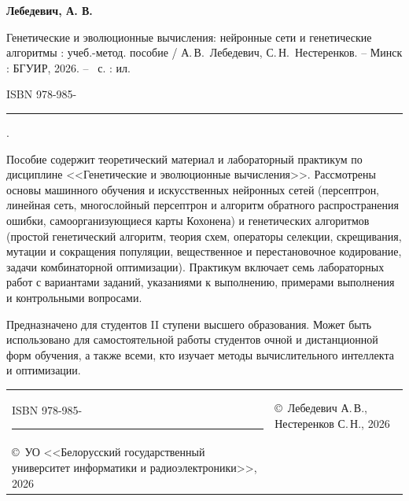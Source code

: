 \vspace{1.5em}
\noindent\hspace*{1.25cm}\textbf{Лебедевич, А. В.}

\noindent\hangindent=1.25cm
Генетические и эволюционные вычисления: нейронные сети и генетические алгоритмы : учеб.-метод. пособие /
А.\,В.~Лебедевич, С.\,Н.~Нестеренков. -- Минск : БГУИР, 2026. -- \pageref{LastPage}~с. : ил.

\noindent\hangindent=1.25cm
ISBN 978-985-\rule{2.2cm}{0.4pt}.

\vspace{1em}
{\small
Пособие содержит теоретический материал и лабораторный практикум по дисциплине <<Генетические и
эволюционные вычисления>>. Рассмотрены основы машинного обучения и искусственных нейронных сетей
(персептрон, линейная сеть, многослойный персептрон и алгоритм обратного распространения ошибки,
самоорганизующиеся карты Кохонена) и генетических алгоритмов (простой генетический алгоритм, теория
схем, операторы селекции, скрещивания, мутации и сокращения популяции, вещественное и перестановочное
кодирование, задачи комбинаторной оптимизации). Практикум включает семь лабораторных работ с
вариантами заданий, указаниями к выполнению, примерами выполнения и контрольными вопросами.

Предназначено для студентов II ступени высшего образования. Может быть использовано для
самостоятельной работы студентов очной и дистанционной форм обучения, а также всеми, кто
изучает методы вычислительного интеллекта и оптимизации.\par}

\vfill
\noindent
\begin{tabular}{@{}p{}@{}p{}@{}}
\raggedright ISBN 978-985-\rule{2.2cm}{0.4pt} &
\raggedright\arraybackslash\small
\copyright\ Лебедевич А.\,В., Нестеренков С.\,Н., 2026\\
\copyright\ УО <<Белорусский государственный университет информатики и радиоэлектроники>>, 2026
\end{tabular}
\newpage
